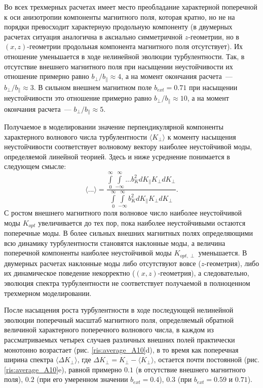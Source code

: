 Во всех трехмерных расчетах имеет место преобладание характерной поперечной к оси анизотропии компоненты магнитного поля, которая кратно, но не на порядки превосходит характерную продольную компоненту (в двумерных расчетах ситуация аналогична в аксиально симметричной $z$-геометрии, но в $(x,z)$-геометрии продольная компонента магнитного поля отсутствует). Их отношение уменьшается в ходе нелинейной эволюции турбулентности. Так, в отсутствие внешнего магнитного поля при насыщении неустойчивости их отношение примерно равно $b_\perp/b_\|\approx4$, а на момент окончания расчета~--- $b_\perp/b_\|\approx3$. В сильном внешнем магнитном поле $b_{ext}=0.71$ при насыщении неустойчивости это отношение примерно равно $b_\perp/b_\|\approx10$, а на момент окончания расчета~--- $b_\perp/b_\|\approx5$. 

Получаемое в моделировании значение перпендикулярной компоненты характерного волнового числа турбулентности $\langle K_\perp\rangle$ к моменту насыщения неустойчивости соответствует волновому вектору наиболее неустойчивой моды, определяемой линейной теорией. Здесь и ниже усреднение понимается в следующем смысле:
\begin{equation}
\label{eq:angles_b0}
\langle...\rangle=\frac{\int\limits_0^\infty\int\limits_{-\infty}^\infty...b_K^2 dK_\|K_\perp dK_\perp}{\int\limits_0^\infty\int\limits_{-\infty}^\infty b_K^2 dK_\|K_\perp dK_\perp}. 
\end{equation}
С ростом внешнего магнитного поля волновое число наиболее неустойчивой моды $K_{opt}$ увеличивается до тех пор, пока наиболее неустойчивыми остаются поперечные моды. В более сильных внешних магнитных полях определяющими всю динамику турбулентности становятся наклонные моды, а величина поперечной компоненты наиболее неустойчивой моды $K_{opt,\perp}$ уменьшается. В двумерных расчетах наклонные моды либо отсутствуют вовсе ($z$-геометрия), либо их динамическое поведение некорректно ($(x,z)$-геометрия), а следовательно, эволюция спектра турбулентности не соответствует получаемой в полноценном трехмерном моделировании. 

После насыщения роста турбулентности в ходе последующей нелинейной эволюции поперечный масштаб магнитного поля, определяемый обратной величиной характерного поперечного волнового числа, в каждом из рассматриваемых четырех случаев различных внешних полей практически монотонно возрастает (рис. \ref{ris:average_A10}d), в то время как поперечная ширина спектра $\langle \Delta K_\perp\rangle$, где $\Delta K_\perp=K_\perp-\langle K_\perp\rangle$, остается почти постоянной (рис. \ref{ris:average_A10}e), равной примерно $0.1$ (в отсутствие внешнего магнитного поля), $0.2$ (при его умеренном значении $b_{ext}=0.4$), $0.3$ (при $b_{ext}=0.59$ и $0.71$). 

